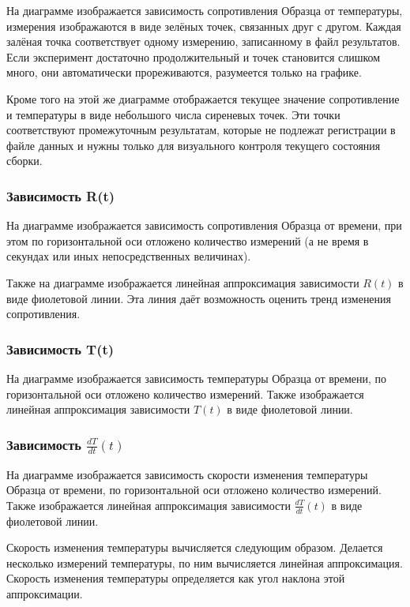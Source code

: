 \documentclass[12pt, a4paper, twocolumn]{report}
\begin{document}
На диаграмме изображается зависимость сопротивления Образца от температуры, измерения изображаются в виде зелёных точек, связанных друг с другом. Каждая залёная точка соответствует одному измерению, записанному в файл результатов. Если эксперимент достаточно продолжительный и точек становится слишком много, они автоматически прореживаются, разумеется только на графике.

Кроме того на этой же диаграмме отображается текущее значение сопротивление и температуры в виде небольшого числа сиреневых точек. Эти точки соответствуют промежуточным результатам, которые не подлежат регистрации в файле данных и нужны только для визуального контроля текущего состояния сборки.

\subsubsection{Зависимость R(t)}

На диаграмме изображается зависимость сопротивления Образца от времени, при этом по горизонтальной оси отложено количество измерений (а не время в секундах или иных непосредственных величинах).

Также на диаграмме изображается линейная аппроксимация зависимости $R(t)$ в виде фиолетовой линии. Эта линия даёт возможность оценить тренд изменения сопротивления.

\subsubsection{Зависимость T(t)}

На диаграмме изображается зависимость температуры Образца от времени, по горизонтальной оси отложено количество измерений. Также изображается линейная аппроксимация зависимости $T(t)$ в виде фиолетовой линии.

\subsubsection{Зависимость $\frac{dT}{dt}(t)$}

На диаграмме изображается зависимость скорости изменения температуры Образца от времени, по горизонтальной оси отложено количество измерений. Также изображается линейная аппроксимация зависимости $\frac{dT}{dt}(t)$ в виде фиолетовой линии.

Скорость изменения температуры вычисляется следующим образом. Делается несколько измерений температуры, по ним вычисляется линейная аппроксимация. Скорость изменения температуры определяется как угол наклона этой аппроксимации.
\end{document}
